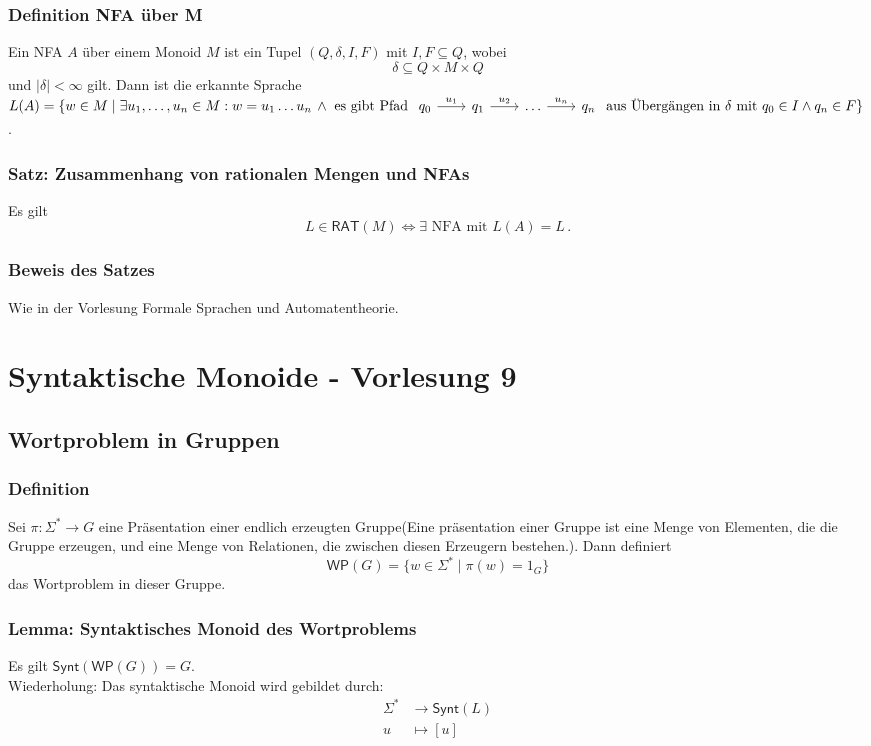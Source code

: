 \documentclass[12pt, german]{article}
\newcommand{\sigstern}{\Sigma^\ast}
\newcommand{\rat}{\mathsf{RAT}}
\newcommand{\synt}{\mathsf{Synt}}
\newcommand{\wop}{\mathsf{WP}}
\begin{document}
	\subsubsection{Definition NFA über M}
	Ein NFA $A$ über einem Monoid $M$ ist ein Tupel $(Q, \delta, I, F)$ mit $I, F \subseteq Q$, wobei $$\delta \subseteq Q \times M \times Q$$ und $|\delta| < \infty$ gilt. 
	Dann ist die erkannte Sprache $L(A) = \{w \in M \mid \exists u_1, \ldots, u_n \in M : w = u_1 \ldots u_n \, \wedge \text{ es gibt Pfad } \begin{tikzcd}[column sep=1.7pc]
		q_0\arrow{r}{u_1} &  q_1 \arrow{r}{u_2} & \ldots \arrow{r}{u_n} & q_n
	\end{tikzcd} \text{ aus Übergängen in } \delta \text{ mit } q_0 \in I \wedge q_n \in F\}$. 

	
	\subsubsection{Satz: Zusammenhang von rationalen Mengen und NFAs}
	Es gilt $$ L \in \rat(M) \iff \exists \text{ NFA mit } L(A) = L \, .$$
	
	\subsubsection{Beweis des Satzes}
	Wie in der Vorlesung Formale Sprachen und Automatentheorie.
	
	\section{Syntaktische Monoide - Vorlesung 9}
	\subsection{Wortproblem in Gruppen}
	\subsubsection{Definition}
	Sei $\pi : \sigstern \to G$ eine Präsentation einer endlich erzeugten Gruppe(Eine präsentation einer Gruppe ist eine Menge von Elementen, die die Gruppe erzeugen, und eine Menge von Relationen, die zwischen diesen Erzeugern bestehen.). Dann definiert $$\wop(G) = \{ w \in \sigstern \mid \pi(w)=1_G\}$$das Wortproblem in dieser Gruppe.
	
	\subsubsection{Lemma: Syntaktisches Monoid des Wortproblems}
	Es gilt $\synt(\wop(G))=G$.\\
	Wiederholung: Das syntaktische Monoid wird gebildet durch: 
	\begin{align*}
		\sigstern &\to \synt(L) \\
		u &\mapsto [u]
	\end{align*}
	
\end{document}
